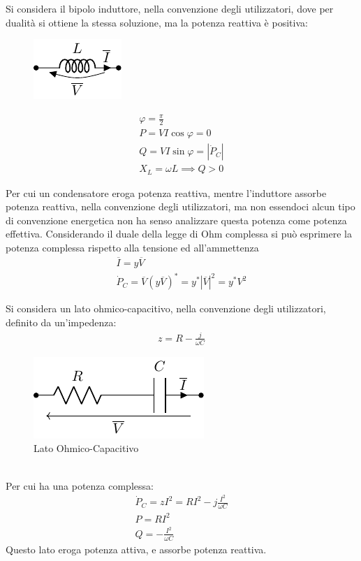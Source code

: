 \documentclass{article}
\numberwithin{equation}{subsection}
\begin{document}
Si considera il bipolo induttore, nella convenzione degli utilizzatori, dove per dualità si ottiene la stessa soluzione, ma la potenza reattiva è positiva:
\begin{figure}[ht]%
    \centering
    \includegraphics{induttore-fasori.pdf}
\end{figure}
\begin{gather*}
    \varphi=\displaystyle\frac{\pi}{2}\\
    P=VI\cos\varphi=0\\
    Q=VI\sin\varphi=|\dot P_C|\\
    X_L=\omega L\implies Q>0
\end{gather*}

Per cui un condensatore eroga potenza reattiva, mentre l'induttore assorbe potenza reattiva, nella convenzione degli utilizzatori, ma non essendoci alcun tipo di convenzione 
energetica non ha senso analizzare questa potenza come potenza effettiva. 
Considerando il duale della legge di Ohm complessa si può esprimere la potenza complessa rispetto alla tensione ed all'ammettenza
\begin{gather*}
    \overline{I}=y\overline{V}\\
    \dot P_C=\overline{V}(y\overline{V})^*=y^*|\overline{V}|^2=y^*V^2
\end{gather*} 


Si considera un lato ohmico-capacitivo, nella convenzione degli utilizzatori, definito da un'impedenza:
\begin{gather*}
    z=R-\displaystyle\frac{j}{\omega C}
\end{gather*}
\begin{figure}[ht]%
    \centering
    \includegraphics{rc-serie-fasori.pdf}
    \caption{Lato Ohmico-Capacitivo}
    \label{fig:rc-serie-fasori}
\end{figure}
\\
Per cui ha una potenza complessa:
\begin{gather*}
    \dot P_C=zI^2=RI^2-j\displaystyle\frac{I^2}{\omega C}\\
    P=RI^2\\
    Q=-\displaystyle\frac{I^2}{\omega C}
\end{gather*}
Questo lato eroga potenza attiva, e assorbe potenza reattiva. 
\end{document}
